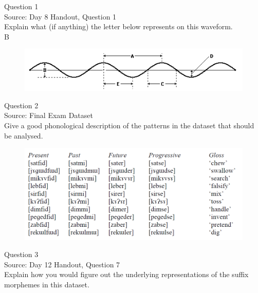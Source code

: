\documentclass[12pt]{article}
\begin{document}
{\large Question 1}\\

Source: Day 8 Handout, Question 1\\

Explain what (if anything) the letter below represents on this waveform.\\

B

\begin{figure}[H]
\includegraphics{../images/sinusoid.png}
\end{figure}

\newpage

{\large Question 2}\\

Source: Final Exam Dataset\\

Give a good phonological description of the patterns in the dataset that should be analysed.\\

\begin{figure}[H]
\includegraphics{../images/final_dataset.png}
\end{figure}

\newpage

{\large Question 3}\\

Source: Day 12 Handout, Question 7\\

Explain how you would figure out the underlying representations of the suffix morphemes in this dataset.\\
\end{document}
